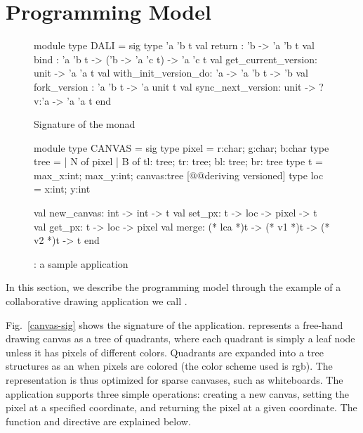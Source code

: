 \section{Programming Model}

\begin{figure}

  \begin{ocaml}
  module type DALI = sig
    type 'a 'b t
    val return : 'b -> 'a 'b t
    val bind : 'a 'b t -> ('b -> 'a 'c t) -> 'a 'c t
    val get_current_version: unit -> 'a 'a t
    val with_init_version_do: 'a -> 'a 'b t -> 'b
    val fork_version : 'a 'b t -> 'a unit t
    val sync_next_version: unit -> ?v:'a -> 'a 'a t
  end
  \end{ocaml}

\label{fig:dali-monad}
\caption{Signature of the \name monad}
\end{figure}

\begin{figure}

  \begin{ocaml}
  module type CANVAS = sig
    type pixel = {r:char; g:char; b:char}
    type tree = 
      | N of pixel
      | B of {tl: tree; tr: tree; bl: tree; br: tree} 
    type t = {max_x:int; max_y:int; canvas:tree} [@@deriving versioned]
    type loc = {x:int; y:int}
  
    val new_canvas: int -> int -> t
    val set_px: t -> loc -> pixel -> t
    val get_px: t -> loc -> pixel
    val merge: (* lca *)t -> (* v1 *)t -> (* v2 *)t -> t
  end
  \end{ocaml}

\label{fig:canvas-sig}
\caption{\drawsome: a sample \name application}
\end{figure}

In this section, we describe the \name programming model through the
example of a collaborative drawing application we call \drawsome.

Fig.~\ref{canvas-sig} shows the signature of the \drawsome
application. \drawsome represents a free-hand drawing canvas as a tree
of quadrants, where each quadrant is simply a leaf node unless it has
pixels of different colors. Quadrants are expanded into a tree
structures as an when pixels are colored (the color scheme used is
rgb). The representation is thus optimized for sparse canvases, such
as whiteboards. The application supports three simple operations:
creating a new canvas, setting the pixel at a specified coordinate,
and returning the pixel at a given coordinate. The  function
and  directive are explained below.

